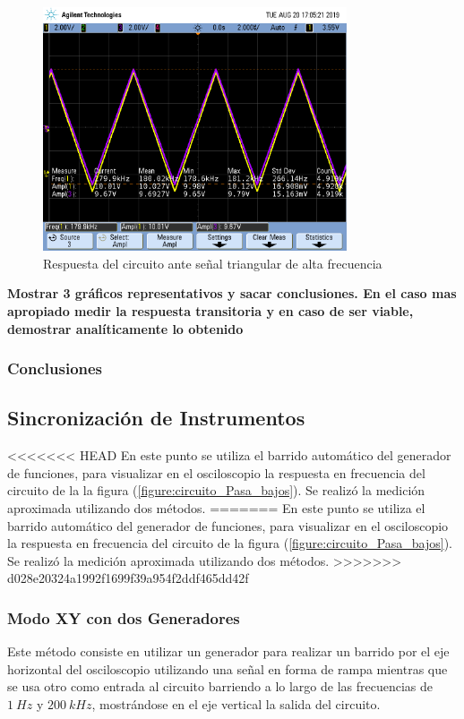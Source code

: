 \documentclass[11pt, a4paper]{article}
\begin{document}
\begin{figure}[H]
	\centering
	\includegraphics[width=0.8\textwidth,trim={0.5cm 5cm  1 5cm},clip]{rta_onda_triang_alta_f.png}
	\caption{Respuesta del circuito ante señal triangular de alta frecuencia} 
	\label{graf:rta_onda_triang_alta_f}
\end{figure}

\textbf{Mostrar 3 gráficos representativos y sacar conclusiones. En el caso mas apropiado medir la respuesta transitoria y en caso de ser viable, demostrar analíticamente lo obtenido}
\subsubsection*{Conclusiones}


\break
\subsection*{Sincronización de Instrumentos}
<<<<<<< HEAD
En este punto se utiliza el barrido automático del generador de funciones, para visualizar en el osciloscopio la respuesta en frecuencia del circuito de la la figura (\ref{figure:circuito_Pasa_bajos}). Se realizó la medición aproximada utilizando dos métodos.
=======
En este punto se utiliza el barrido automático del generador de funciones, para visualizar en el osciloscopio la respuesta en frecuencia del circuito de la figura (\ref{figure:circuito_Pasa_bajos}). Se realizó la medición aproximada utilizando dos métodos.
>>>>>>> d028e20324a1992f1699f39a954f2ddf465dd42f

\subsubsection*{Modo XY con dos Generadores}
Este método consiste en utilizar un generador para realizar un barrido por el eje horizontal del osciloscopio utilizando una señal en forma de rampa mientras que se usa otro como entrada al circuito barriendo a lo largo de las frecuencias de $1 \ Hz$ y $200 \ kHz$, mostrándose en el eje vertical la salida del circuito.
\end{document}
